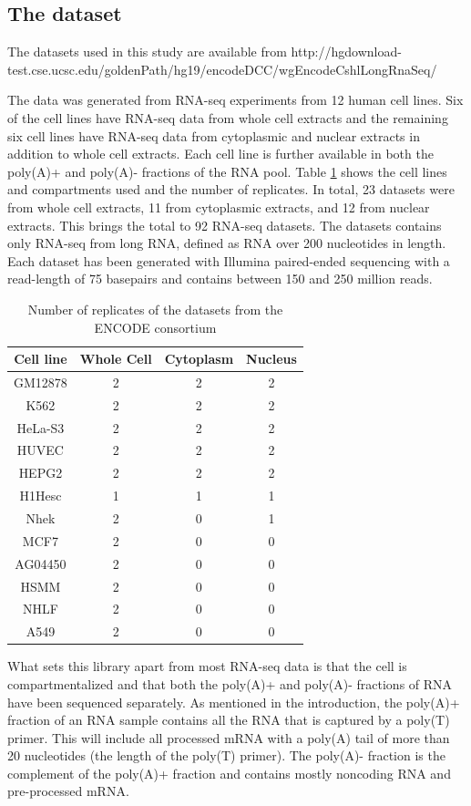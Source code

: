\subsection{The dataset}
The datasets used in this study are available from
http://hgdownload-test.cse.ucsc.edu/goldenPath/hg19/encodeDCC/wgEncodeCshlLongRnaSeq/

The data was generated from RNA-seq experiments from 12 human cell lines. Six
of the cell lines have RNA-seq data from whole cell extracts and the remaining
six cell lines have RNA-seq data from cytoplasmic and nuclear extracts in
addition to whole cell extracts. Each cell line is further available in both
the poly(A)+ and poly(A)- fractions of the RNA pool. Table \ref{tab:Datasets}
shows the cell lines and compartments used and the number of replicates. In
total, 23 datasets were from whole cell extracts, 11 from cytoplasmic
extracts, and 12 from nuclear extracts. This brings the total to 92
RNA-seq datasets. The datasets contains only RNA-seq from long RNA, defined as
RNA over 200 nucleotides in length. Each dataset has been generated with
Illumina paired-ended sequencing with a read-length of 75 basepairs and
contains between 150 and 250 million reads.

\begin{table}[hb]
	\centering
	\begin{tabular}{cccc}
	  Cell line & Whole Cell & Cytoplasm & Nucleus \\
	  \midrule
	  GM12878 & 2 & 2 & 2 \\
	  K562 & 2 & 2 & 2 \\
	  HeLa-S3 & 2 & 2 & 2 \\
	  HUVEC & 2 & 2 & 2 \\
	  HEPG2 & 2 & 2 & 2 \\
	  H1Hesc & 1 & 1 & 1 \\
	  Nhek & 2 & 0 & 1 \\
	  MCF7 & 2 & 0 & 0 \\
	  AG04450 & 2 & 0 & 0 \\
	  HSMM & 2 & 0 & 0 \\
	  NHLF & 2 & 0 & 0 \\
	  A549 & 2 & 0 & 0 \\
	\end{tabular}
	\caption{Number of replicates of the datasets from the ENCODE consortium}
	\label{tab:Datasets}
\end{table}

What sets this library apart from most RNA-seq data is that the cell is
compartmentalized and that both the poly(A)+ and poly(A)- fractions of RNA have
been sequenced separately. As mentioned in the introduction, the poly(A)+
fraction of an RNA sample contains all the RNA that is captured by a poly(T)
primer. This will include all processed mRNA with a poly(A) tail of more than
20 nucleotides (the length of the poly(T) primer). The poly(A)- fraction is the
complement of the poly(A)+ fraction and contains mostly noncoding RNA and
pre-processed mRNA.

